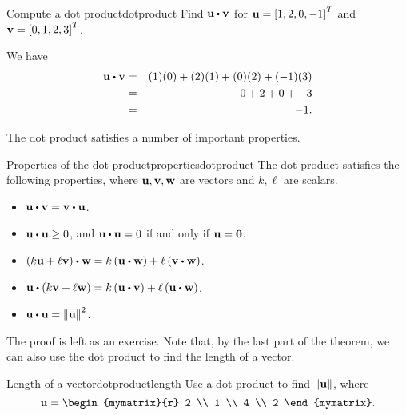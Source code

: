 \begin{example}{Compute a dot product}{dotproduct}
  Find $\vect{u} \dotprod \vect{v}$ for $\mbox{\bf u}=\left[1,2,0,-1\right]^T$
  and $\mbox{\bf v}=\left[0,1,2,3\right]^T$.
\end{example}

\begin{solution}
  We have
  \begin{eqnarray*}
    \vect{u} \dotprod \vect{v}
    &=&
        (1)(0) + (2)(1) + (0)(2) + (-1)(3) \\
    &=&
        0 + 2 + 0 + -3 \\
    &=&
        -1.
  \end{eqnarray*}
\end{solution}

The dot product satisfies a number of important properties. 

\begin{theorem}{Properties of the dot product}{propertiesdotproduct}
  The dot product satisfies the following properties, where
  $\mbox{\bf u},\mbox{\bf v},\mbox{\bf w}$ are vectors and $k,\ell$ are
  scalars.
  \begin{itemize}
  \item $\vect{u}\dotprod\vect{v}=\vect{v}\dotprod\vect{u}$.
  \item $\vect{u}\dotprod\vect{u}\geq 0$, and $\vect{u}\dotprod\vect{u}=0$ if and only if $\mbox{\bf u}=\mbox{\bf 0}$.
  \item $\tup{k\vect{u}+\ell\vect{v}}\dotprod\vect{w}=k\tup{\vect{u}\dotprod\vect{w}}+\ell\tup{\vect{v}\dotprod\vect{w}}$.
  \item $\vect{u}\dotprod\tup{k\vect{v}+\ell\vect{w}}
    =k\tup{\vect{u}\dotprod \vect{v}}+\ell\tup{\vect{u}\dotprod\vect{w}}$.
  \item $\vect{u}\dotprod\vect{u}=\norm{\vect{u}}^{2}$.
  \end{itemize}
\end{theorem}

The proof is left as an exercise. Note that, by the last part of the
theorem, we can also use the dot product to find the length of a
vector.

\begin{example}{Length of a vector}{dotproductlength}
  Use a dot product to find $\left\|\mbox{\bf u}\right\|$, where
  \begin{equation*}
    \vect{u}
    =
    \begin{mymatrix}{r}
      2 \\
      1 \\
      4 \\
      2
    \end{mymatrix}.
  \end{equation*}
\end{example}

